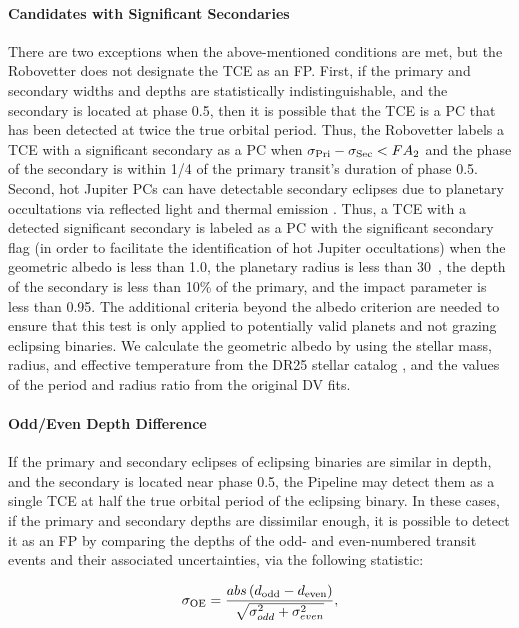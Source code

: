 \paragraph{Candidates with Significant Secondaries}
\label{s:sscand}
There are two exceptions when the above-mentioned conditions are met, but the Robovetter does not designate the TCE as an FP. First, if the primary and secondary widths and depths are statistically indistinguishable, and the secondary is located at phase 0.5, then it is possible that the TCE is a PC that has been detected at twice the true orbital period. Thus, the Robovetter labels a TCE with a significant secondary as a PC when ${\sigma_{\rm Pri} - \sigma_{\rm Sec} < FA_{2}}$ and the phase of the secondary is within 1/4 of the primary transit's duration of phase 0.5. Second, hot Jupiter PCs can have detectable secondary eclipses due to planetary occultations via reflected light and thermal emission \citep{Coughlin2012}. Thus, a TCE with a detected significant secondary is labeled as a PC with the significant secondary flag (in order to facilitate the identification of hot Jupiter occultations) when the geometric albedo is less than 1.0, the planetary radius is less than 30~\re{}, the depth of the secondary is less than 10\% of the primary, and the impact parameter is less than 0.95. The additional criteria beyond the albedo criterion are needed to ensure that this test is only applied to potentially valid planets and not grazing eclipsing binaries. We calculate the geometric albedo by using the stellar mass, radius, and effective temperature from the DR25 stellar catalog \citep{Mathur2017ApJS}, and the values of the period and radius ratio from the original DV fits.



\paragraph{Odd/Even Depth Difference}

\label{s:oddeven}
If the primary and secondary eclipses of eclipsing binaries are similar in depth, and the secondary is located near phase 0.5, the \kepler{} Pipeline may detect them as a single TCE at half the true orbital period of the eclipsing binary. In these cases, if the primary and secondary depths are dissimilar enough, it is possible to detect it as an FP by comparing the depths of the odd- and even-numbered transit events and their associated uncertainties, via the following statistic:

\begin{equation}
\sigma_{\rm OE} = \frac{abs\left(d_{\rm odd} - d_{\rm even}\right)}{\sqrt{\sigma_{odd}^{2} + \sigma_{even}^{2}}} ,
\end{equation}

